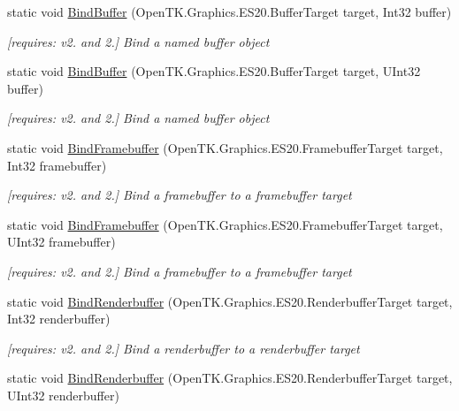 \begin{DoxyCompactItemize}
static void \hyperlink{class_open_t_k_1_1_graphics_1_1_e_s20_1_1_g_l_a1d61c4ed24ab2dcbfc9709f043f097a0}{Bind\-Buffer} (Open\-T\-K.\-Graphics.\-E\-S20.\-Buffer\-Target target, Int32 buffer)
\begin{DoxyCompactList}\small\item\em \mbox{[}requires\-: v2. and 2.\mbox{]} Bind a named buffer object \end{DoxyCompactList}\item 
static void \hyperlink{class_open_t_k_1_1_graphics_1_1_e_s20_1_1_g_l_a3a49e7b859be06ea4568695b5ac2aaf2}{Bind\-Buffer} (Open\-T\-K.\-Graphics.\-E\-S20.\-Buffer\-Target target, U\-Int32 buffer)
\begin{DoxyCompactList}\small\item\em \mbox{[}requires\-: v2. and 2.\mbox{]} Bind a named buffer object \end{DoxyCompactList}\item 
static void \hyperlink{class_open_t_k_1_1_graphics_1_1_e_s20_1_1_g_l_a2d32ccb6af9001cdd8899b5a87c03bdb}{Bind\-Framebuffer} (Open\-T\-K.\-Graphics.\-E\-S20.\-Framebuffer\-Target target, Int32 framebuffer)
\begin{DoxyCompactList}\small\item\em \mbox{[}requires\-: v2. and 2.\mbox{]} Bind a framebuffer to a framebuffer target \end{DoxyCompactList}\item 
static void \hyperlink{class_open_t_k_1_1_graphics_1_1_e_s20_1_1_g_l_aebe9e8d5982996734b1357954f330d07}{Bind\-Framebuffer} (Open\-T\-K.\-Graphics.\-E\-S20.\-Framebuffer\-Target target, U\-Int32 framebuffer)
\begin{DoxyCompactList}\small\item\em \mbox{[}requires\-: v2. and 2.\mbox{]} Bind a framebuffer to a framebuffer target \end{DoxyCompactList}\item 
static void \hyperlink{class_open_t_k_1_1_graphics_1_1_e_s20_1_1_g_l_aa0dc5584c50d43051c8c962fb3b16877}{Bind\-Renderbuffer} (Open\-T\-K.\-Graphics.\-E\-S20.\-Renderbuffer\-Target target, Int32 renderbuffer)
\begin{DoxyCompactList}\small\item\em \mbox{[}requires\-: v2. and 2.\mbox{]} Bind a renderbuffer to a renderbuffer target \end{DoxyCompactList}\item 
static void \hyperlink{class_open_t_k_1_1_graphics_1_1_e_s20_1_1_g_l_a661bccc87e5c7df63e7e772897b3e178}{Bind\-Renderbuffer} (Open\-T\-K.\-Graphics.\-E\-S20.\-Renderbuffer\-Target target, U\-Int32 renderbuffer)

\end{DoxyCompactItemize}
